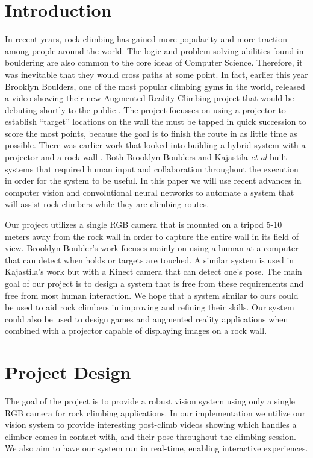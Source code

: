 \documentclass{chi2009}
\begin{document}
\section{Introduction}
In recent years, rock climbing has gained more popularity and more traction among people around the world. The logic and problem solving abilities found in bouldering are also common to the core ideas of Computer Science. Therefore, it was inevitable that they would cross paths at some point. In fact, earlier this year Brooklyn Boulders, one of the most popular climbing gyms in the world, released a video showing their new Augmented Reality Climbing project that would be debuting shortly to the public \cite{brooklynboulders}. The project focusses on using a projector to establish ``target'' locations on the wall the must be tapped in quick succession to score the most points, because the goal is to finish the route in as little time as possible. There was earlier work that looked into building a hybrid system with a projector and a rock wall \cite{kajastila2014augmented}. Both Brooklyn Boulders and Kajastila {\em et al} built systems that required human input and collaboration throughout the execution in order for the system to be useful. In this paper we will use recent advances in computer vision and convolutional neural networks to automate a system that will assist rock climbers while they are climbing routes.

Our project utilizes a single RGB camera that is mounted on a tripod 5-10 meters away from the rock wall in order to capture the entire wall in its field of view. Brooklyn Boulder's work focuses mainly on using a human at a computer that can detect when holds or targets are touched. A similar system is used in Kajastila's work but with a Kinect camera that can detect one's pose. The main goal of our project is to design a system that is free from these requirements and free from most human interaction. We hope that a system similar to ours could be used to aid rock climbers in improving and refining their skills. Our system could also be used to design games and augmented reality applications when combined with a projector capable of displaying images on a rock wall.

\section{Project Design}

The goal of the project is to provide a robust vision system using only a single RGB camera for rock climbing applications. In our implementation we utilize our vision system to provide interesting post-climb videos showing which handles a climber comes in contact with, and their pose throughout the climbing session. We also aim to have our system run in real-time, enabling interactive experiences.
\end{document}
